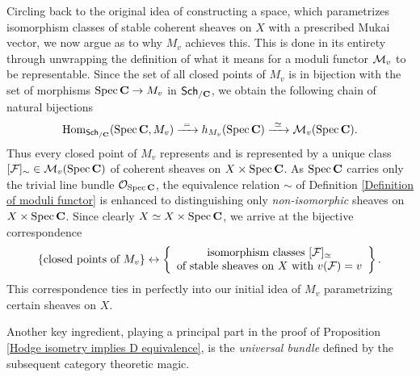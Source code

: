 Circling back to the original idea of constructing a space, which parametrizes isomorphism classes of stable coherent sheaves on $X$ with a prescribed Mukai vector, we now argue as to why $M_v$ achieves this. This is done in its entirety through unwrapping the definition of what it means for a moduli functor $\mathcal M_v$ to be representable. Since the set of all closed points of $M_v$ is in bijection with the set of morphisms $\operatorname{Spec}\mathbf C \to M_v$ in $\mathsf{Sch}_{/\mathbf C}$, we obtain the following chain of natural bijections
\begin{equation}
    \label{eq: natural iso applied to SpecC}
    \mathrm{Hom}_{\mathsf{Sch}_{/\mathbf C}}(\operatorname{Spec}\mathbf C, M_v) \xrightarrow{\ = \ } h_{M_v}(\operatorname{Spec}\mathbf C) \xrightarrow{\ \simeq \ } \mathcal M_v(\operatorname{Spec}\mathbf C).
\end{equation}
Thus every closed point of $M_v$ represents and is represented by a unique class $[\mathcal F]_\sim \in \mathcal M_v(\operatorname{Spec}\mathbf C)$ of coherent sheaves on $X \times \operatorname{Spec}\mathbf C$. As $\operatorname{Spec}\mathbf C$ carries only the trivial line bundle ${\mathcal{O}_{\operatorname{Spec}\mathbf C}}$, the equivalence relation $\sim$ of Definition \ref{Definition of moduli functor} is enhanced to distinguishing only \emph{non-isomorphic} sheaves on $X \times \operatorname{Spec}\mathbf C$. Since clearly $X \simeq X \times \operatorname{Spec}\mathbf C$, we arrive at the bijective correspondence
\begin{equation}
    \label{eq: closed points of M}
    \{ \text{closed points of $M_v$}\} 
    \leftrightarrow \left\{
        \begin{array}{c}
            \text{isomorphism classes $[\mathcal F]_\simeq$} \\
            \text{of stable sheaves on $X$ with $v(\mathcal F) = v$}
        \end{array}
        \right\}.
\end{equation}
This correspondence ties in perfectly into our initial idea of $M_v$ parametrizing certain sheaves on $X$.  

Another key ingredient, playing a principal part in the proof of Proposition \ref{Hodge isometry implies D equivalence}, is the \emph{universal bundle} defined by the subsequent category theoretic magic.


